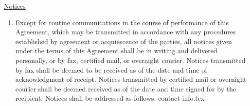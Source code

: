\underline{Notices}
\begin{enumerate}
    \item Except for routine communications in the course of performance of
    this Agreement, which may be transmitted in accordance with any
    procedures established by agreement or acquiescence of the parties, all
    notices given under the terms of this Agreement shall be in writing and
    delivered personally, or by fax, certified mail, or overnight courier.
    Notices transmitted by fax shall be deemed to be received as of the
    date and time of acknowledgment of receipt. Notices transmitted by
    certified mail or overnight courier shall be deemed received as of the
    date and time signed for by the recipient. Notices shall be addressed
    as follows:
    {contact-info.tex}
\end{enumerate}